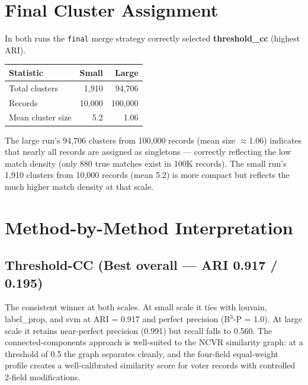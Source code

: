 \documentclass[11pt, a4paper]{article}
\begin{document}
\section{Final Cluster Assignment}

In both runs the \texttt{final} merge strategy correctly selected
\textbf{threshold\_cc} (highest ARI).

\begin{table}[h!]
\centering
\begin{tabular}{lrr}
\toprule
\textbf{Statistic} & \textbf{Small} & \textbf{Large} \\
\midrule
Total clusters   & 1,910  & 94,706 \\
Records          & 10,000 & 100,000 \\
Mean cluster size & 5.2   & 1.06 \\
\bottomrule
\end{tabular}
\end{table}

The large run's 94,706 clusters from 100,000 records (mean size $\approx$1.06)
indicates that nearly all records are assigned as singletons --- correctly
reflecting the low match density (only 880 true matches exist in 100K records).
The small run's 1,910 clusters from 10,000 records (mean 5.2) is more
compact but reflects the much higher match density at that scale.

\section{Method-by-Method Interpretation}

\subsection*{Threshold-CC (Best overall --- ARI 0.917 / 0.195)}
The consistent winner at both scales. At small scale it ties with louvain,
label\_prop, and svm at ARI = 0.917 and perfect precision (B$^3$-P = 1.0).
At large scale it retains near-perfect precision (0.991) but recall falls to
0.560. The connected-components approach is well-suited to the NCVR similarity
graph: at a threshold of 0.5 the graph separates cleanly, and the four-field
equal-weight profile creates a well-calibrated similarity score for voter
records with controlled 2-field modifications.
\end{document}

